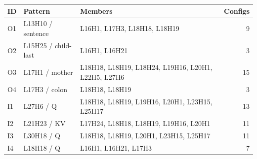 \begin{tabular}{lp{.23\linewidth}p{.49\linewidth}r}
\toprule
ID & Pattern & Members & Configs \\
\midrule
O1 & L13H10 / sentence & L16H1, L17H3, L18H18, L18H19 & 9 \\
O2 & L15H25 / child-last & L16H1, L16H21 & 3 \\
O3 & L17H1 / mother & L18H18, L18H19, L18H24, L19H16, L20H1, L22H5, L27H6 & 15 \\
O4 & L17H3 / colon & L18H18, L18H19 & 3 \\
I1 & L27H6 / Q & L18H18, L18H19, L19H16, L20H1, L23H15, L25H17 & 13 \\
I2 & L21H23 / KV & L17H24, L18H18, L18H19, L19H16, L20H1 & 11 \\
I3 & L30H18 / Q & L18H18, L18H19, L20H1, L23H15, L25H17 & 11 \\
I4 & L18H18 / Q & L16H1, L16H21, L17H3 & 7 \\
\bottomrule
\end{tabular}
